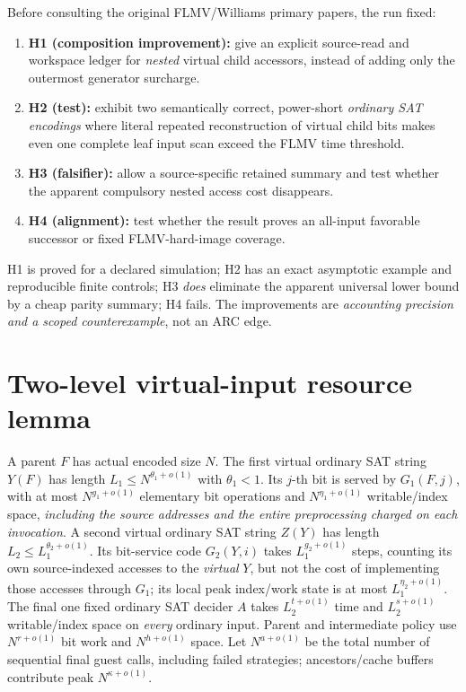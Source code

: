 \documentclass[11pt]{article}
\begin{document}
Before consulting the original FLMV/Williams primary papers, the run fixed:
\begin{enumerate}
\item \textbf{H1 (composition improvement):} give an explicit
source-read and workspace ledger for \emph{nested} virtual child accessors,
instead of adding only the outermost generator surcharge.
\item \textbf{H2 (test):} exhibit two semantically correct, power-short
\emph{ordinary SAT encodings} where literal repeated reconstruction of
virtual child bits makes even one complete leaf input scan exceed the
FLMV time threshold.
\item \textbf{H3 (falsifier):} allow a source-specific retained summary and
test whether the apparent compulsory nested access cost disappears.
\item \textbf{H4 (alignment):} test whether the result proves an
all-input favorable successor or fixed FLMV-hard-image coverage.
\end{enumerate}
H1 is proved for a declared simulation; H2 has an exact asymptotic example
and reproducible finite controls; H3 \emph{does} eliminate the apparent
universal lower bound by a cheap parity summary; H4 fails. The improvements
are \emph{accounting precision and a scoped counterexample}, not an ARC edge.

\section{Two-level virtual-input resource lemma}
A parent \(F\) has actual encoded size \(N\). The first virtual ordinary
SAT string \(Y(F)\) has length
\(L_1\le N^{\theta_1+o(1)}\) with \(\theta_1<1\).
Its \(j\)-th bit is served by \(G_1(F,j)\), with at most
\(N^{g_1+o(1)}\) elementary bit operations and
\(N^{\eta_1+o(1)}\) writable/index space, \emph{including the source
addresses and the entire preprocessing charged on each invocation}.
A second virtual ordinary SAT string \(Z(Y)\) has length
\(L_2\le L_1^{\theta_2+o(1)}\). Its bit-service code \(G_2(Y,i)\)
takes \(L_1^{g_2+o(1)}\) steps, counting its own source-indexed
accesses to the \emph{virtual} \(Y\), but not the cost of implementing
those accesses through \(G_1\); its local peak index/work state is at most
\(L_1^{\eta_2+o(1)}\). The final one fixed ordinary SAT decider \(A\)
takes \(L_2^{t+o(1)}\) time and \(L_2^{s+o(1)}\) writable/index space
on \emph{every} ordinary input. Parent and intermediate policy use
\(N^{r+o(1)}\) bit work and \(N^{h+o(1)}\) space.
Let \(N^{a+o(1)}\) be the total number of sequential final guest calls,
including failed strategies; ancestors/cache buffers contribute peak
\(N^{\kappa+o(1)}\).
\end{document}
